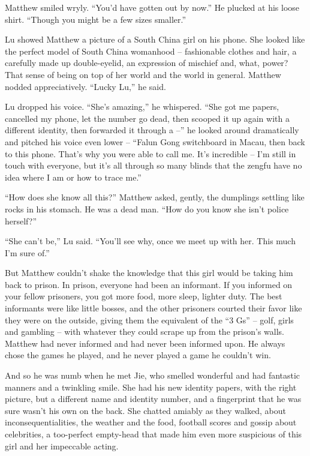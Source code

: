 Matthew smiled wryly. ``You'd have gotten out by now.'' He plucked at
his loose shirt. ``Though you might be a few sizes smaller.''

Lu showed Matthew a picture of a South China girl on his phone. She
looked like the perfect model of South China womanhood --
fashionable clothes and hair, a carefully made up double-eyelid, an
expression of mischief and, what, power? That sense of being on top
of her world and the world in general. Matthew nodded
appreciatively. ``Lucky Lu,'' he said.

Lu dropped his voice. ``She's amazing,'' he whispered. ``She got me
papers, cancelled my phone, let the number go dead, then scooped it
up again with a different identity, then forwarded it through a --''
he looked around dramatically and pitched his voice even lower --
``Falun Gong switchboard in Macau, then back to this phone. That's
why you were able to call me. It's incredible -- I'm still in touch
with everyone, but it's all through so many blinds that the zengfu
have no idea where I am or how to trace me.''

``How does she know all this?'' Matthew asked, gently, the dumplings
settling like rocks in his stomach. He was a dead man. ``How do you
know she isn't police herself?''

``She can't be,'' Lu said. ``You'll see why, once we meet up with her.
This much I'm sure of.''

But Matthew couldn't shake the knowledge that this girl would be
taking him back to prison. In prison, everyone had been an
informant. If you informed on your fellow prisoners, you got more
food, more sleep, lighter duty. The best informants were like
little bosses, and the other prisoners courted their favor like
they were on the outside, giving them the equivalent of the ``3 Gs''
-- golf, girls and gambling -- with whatever they could scrape up
from the prison's walls. Matthew had never informed and had never
been informed upon. He always chose the games he played, and he
never played a game he couldn't win.

And so he was numb when he met Jie, who smelled wonderful and had
fantastic manners and a twinkling smile. She had his new identity
papers, with the right picture, but a different name and identity
number, and a fingerprint that he was sure wasn't his own on the
back. She chatted amiably as they walked, about
inconsequentialities, the weather and the food, football scores and
gossip about celebrities, a too-perfect empty-head that made him
even more suspicious of this girl and her impeccable acting.

